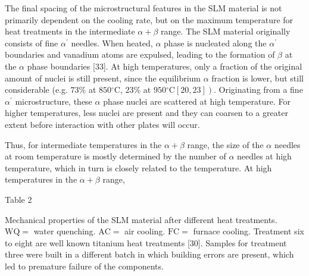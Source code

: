 \documentclass[10pt]{article}
\begin{document}
The final spacing of the microstructural features in the SLM material is not primarily dependent on the cooling rate, but on the maximum temperature for heat treatments in the intermediate $\alpha+\beta$ range. The SLM material originally consists of fine $\alpha^{\prime}$ needles. When heated, $\alpha$ phase is nucleated along the $\alpha^{\prime}$ boundaries and vanadium atoms are expulsed, leading to the formation of $\beta$ at the $\alpha$ phase boundaries [33]. At high temperatures, only a fraction of the original amount of nuclei is still present, since the equilibrium $\alpha$ fraction is lower, but still considerable (e.g. $73 \%$ at $850{ }^{\circ} \mathrm{C}$, $23 \%$ at $\left.950{ }^{\circ} \mathrm{C}[20,23]\right)$. Originating from a fine $\alpha^{\prime}$ microstructure, these $\alpha$ phase nuclei are scattered at high temperature. For higher temperatures, less nuclei are present and they can coarsen to a greater extent before interaction with other plates will occur.

Thus, for intermediate temperatures in the $\alpha+\beta$ range, the size of the $\alpha$ needles at room temperature is mostly determined by the number of $\alpha$ needles at high temperature, which in turn is closely related to the temperature. At high temperatures in the $\alpha+\beta$ range,

Table 2

Mechanical properties of the SLM material after different heat treatments. $\mathrm{WQ}=$ water quenching. $\mathrm{AC}=$ air cooling. $\mathrm{FC}=$ furnace cooling. Treatment six to eight are well known titanium heat treatments [30]. Samples for treatment three were built in a different batch in which building errors are present, which led to premature failure of the components.
\end{document}
